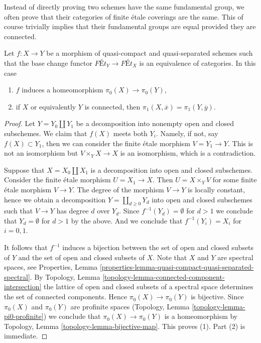 \noindent
Instead of directly proving two schemes have the same fundamental
group, we often prove that their categories of finite \'etale
coverings are the same. This of course trivially implies that
their fundamental groups are equal provided they are connected.

\begin{lemma}
\label{lemma-what-equivalence-gives}
Let $f : X \to Y$ be a morphism of quasi-compact and quasi-separated schemes
such that the base change functor $\textit{F\'Et}_Y \to \textit{F\'Et}_X$
is an equivalence of categories. In this case
\begin{enumerate}
\item $f$ induces a homeomorphism $\pi_0(X) \to \pi_0(Y)$,
\item if $X$ or equivalently $Y$ is connected, then
$\pi_1(X, \overline{x}) = \pi_1(Y, \overline{y})$.
\end{enumerate}
\end{lemma}

\begin{proof}
Let $Y = Y_0 \amalg Y_1$ be a decomposition into nonempty open and closed
subschemes. We claim that $f(X)$ meets both $Y_i$. Namely, if not,
say $f(X) \subset Y_1$, then we can consider the finite \'etale
morphism $V = Y_1 \to Y$. This is not an
isomorphism but $V \times_Y X \to X$ is an isomorphism, which is
a contradiction.

\medskip\noindent
Suppose that $X = X_0 \amalg X_1$ is a decomposition into open and closed
subschemes. Consider the finite \'etale morphism $U = X_1 \to X$. Then
$U = X \times_Y V$ for some finite \'etale morphism $V \to Y$. The degree
of the morphism $V \to Y$ is locally constant, hence we obtain a decomposition
$Y = \coprod_{d \geq 0} Y_d$ into open and closed subschemes
such that $V \to Y$ has degree $d$ over $Y_d$. Since
$f^{-1}(Y_d) = \emptyset$ for $d > 1$ we conclude that $Y_d = \emptyset$
for $d > 1$ by the above. And we conclude that $f^{-1}(Y_i) = X_i$
for $i = 0, 1$.

\medskip\noindent
It follows that $f^{-1}$ induces a bijection between the set of
open and closed subsets of $Y$ and the set of open and closed subsets of $X$.
Note that $X$ and $Y$ are spectral spaces, see Properties, Lemma
\ref{properties-lemma-quasi-compact-quasi-separated-spectral}.
By Topology, Lemma \ref{topology-lemma-connected-component-intersection}
the lattice of open and closed subsets of a spectral space
determines the set of connected components.
Hence $\pi_0(X) \to \pi_0(Y)$ is bijective. Since $\pi_0(X)$ and
$\pi_0(Y)$ are profinite spaces
(Topology, Lemma \ref{topology-lemma-pi0-profinite})
we conclude that $\pi_0(X) \to \pi_0(Y)$ is a homeomorphism by
Topology, Lemma \ref{topology-lemma-bijective-map}. This proves (1).
Part (2) is immediate.
\end{proof}

